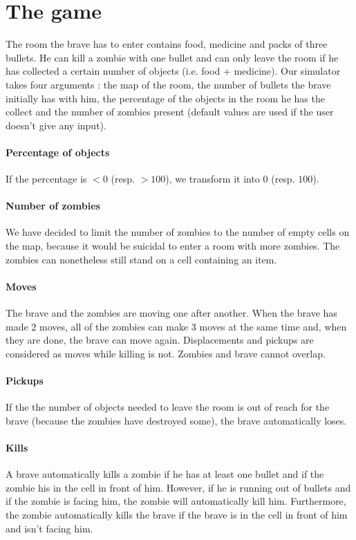 \documentclass[11pt,a4paper]{article}
\begin{document}
\section{The game}

The room the brave has to enter contains food, medicine and packs of three bullets. He can kill a zombie with one bullet and can only leave the room if he has collected a certain number of objects (i.e. food + medicine). Our simulator takes four arguments : the map of the room, the number of bullets the brave initially has with him, the percentage of the objects in the room he has the collect and the number of zombies present (default values are used if the user doesn't give any input).

\paragraph{Percentage of objects} If the percentage is $< 0$ (resp. $ > 100$), we transform it into $0$ (resp. $100$).

\paragraph{Number of zombies} We have decided to limit the number of zombies to the number of empty cells on the map, because it would be suicidal to enter a room with more zombies. The zombies can nonetheless still stand on a cell containing an item. 

\paragraph{Moves} The brave and the zombies are moving one after another. When the brave has made $2$ moves, all of the zombies can make $3$ moves at the same time and, when they are done, the brave can move again. Displacements and pickups are considered as moves while killing is not. Zombies and brave cannot overlap.

\paragraph{Pickups} If the the number of objects needed to leave the room is out of reach for the brave (because the zombies have destroyed some), the brave automatically loses. 

\paragraph{Kills} \label {kills} A brave automatically kills a zombie if he has at least one bullet and if the zombie his in the cell in front of him. However, if he is running out of bullets and if the zombie is facing him, the zombie will automatically kill him. Furthermore, the zombie automatically kills the brave if the brave is in the cell in front of him and isn't facing him.
\end{document}
